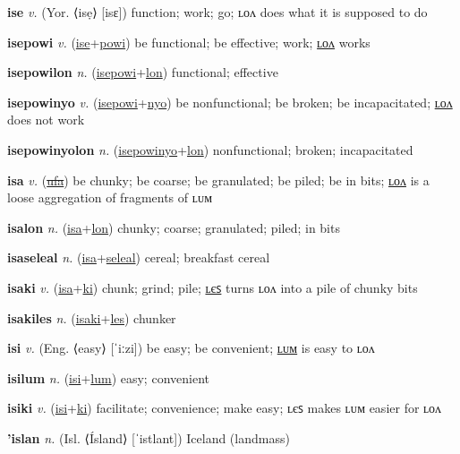 \textbf{\hypertarget{ise}{ise}} \textit{v.} (Yor. ⟨isẹ⟩ [isɛ])
function; work; go; ʟᴏᴧ does what it is supposed to do

\textbf{\hypertarget{isepowi}{isepowi}} \textit{v.} (\hyperlink{ise}{ise}+\allowbreak \hyperlink{powi}{powi})
be functional; be effective; work; \hyperlink{isepowilon}{ʟᴏᴧ} works

\textbf{\hypertarget{isepowilon}{isepowilon}} \textit{n.} (\hyperlink{isepowi}{isepowi}+\allowbreak \hyperlink{lon}{lon})
functional; effective

\textbf{\hypertarget{isepowinyo}{isepowinyo}} \textit{v.} (\hyperlink{isepowi}{isepowi}+\allowbreak \hyperlink{nyo}{nyo})
be nonfunctional; be broken; be incapacitated; \hyperlink{isepowinyolon}{ʟᴏᴧ} does not work

\textbf{\hypertarget{isepowinyolon}{isepowinyolon}} \textit{n.} (\hyperlink{isepowinyo}{isepowinyo}+\allowbreak \hyperlink{lon}{lon})
nonfunctional; broken; incapacitated

\textbf{\hypertarget{isa}{isa}} \textit{v.} (\hyperlink{ufa}{\sout{ufa}})
be chunky; be coarse; be granulated; be piled; be in bits; \hyperlink{isalon}{ʟᴏᴧ} is a loose aggregation of fragments of ʟᴜᴍ

\textbf{\hypertarget{isalon}{isalon}} \textit{n.} (\hyperlink{isa}{isa}+\allowbreak \hyperlink{lon}{lon})
chunky; coarse; granulated; piled; in bits

\textbf{\hypertarget{isaseleal}{isaseleal}} \textit{n.} (\hyperlink{isa}{isa}+\allowbreak \hyperlink{seleal}{seleal})
cereal; breakfast cereal

\textbf{\hypertarget{isaki}{isaki}} \textit{v.} (\hyperlink{isa}{isa}+\allowbreak \hyperlink{ki}{ki})
chunk; grind; pile; \hyperlink{isakiles}{ʟєꜱ} turns ʟᴏᴧ into a pile of chunky bits

\textbf{\hypertarget{isakiles}{isakiles}} \textit{n.} (\hyperlink{isaki}{isaki}+\allowbreak \hyperlink{les}{les})
chunker

\textbf{\hypertarget{isi}{isi}} \textit{v.} (Eng. ⟨easy⟩ [ˈiːzi])
be easy; be convenient; \hyperlink{isilum}{ʟᴜᴍ} is easy to ʟᴏᴧ

\textbf{\hypertarget{isilum}{isilum}} \textit{n.} (\hyperlink{isi}{isi}+\allowbreak \hyperlink{lum}{lum})
easy; convenient

\textbf{\hypertarget{isiki}{isiki}} \textit{v.} (\hyperlink{isi}{isi}+\allowbreak \hyperlink{ki}{ki})
facilitate; convenience; make easy; ʟєꜱ makes ʟᴜᴍ easier for ʟᴏᴧ

\textbf{\hypertarget{'islan}{'islan}} \textit{n.} (Isl. ⟨Ísland⟩ [ˈistlant])
Iceland (landmass)

